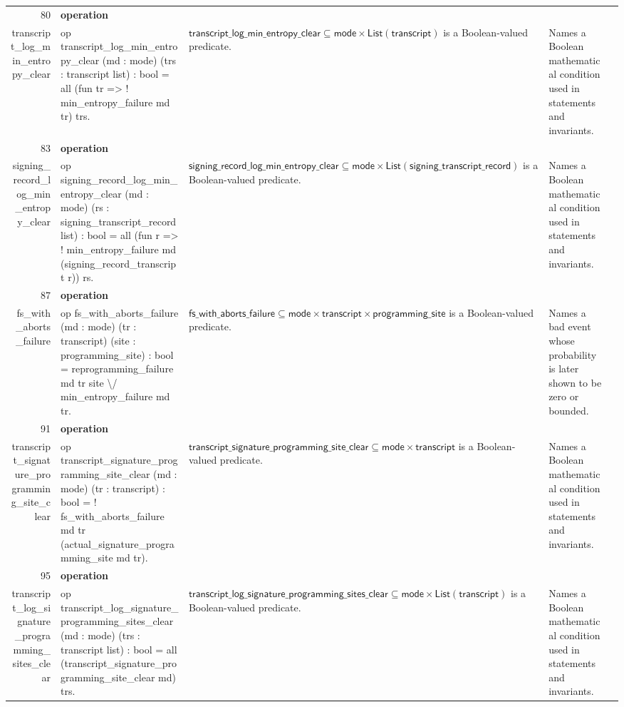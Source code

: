 \documentclass[10pt]{article}
\newcommand{\ec}[1]{\begingroup\ttfamily\scriptsize #1\endgroup}
\begin{document}
\begin{longtable}{r L{0.17\textwidth} L{0.26\textwidth} L{0.27\textwidth} L{0.20\textwidth}}
80 & \textbf{operation}\\\ec{transcript\_log\_min\_entropy\_clear} & \ec{op transcript\_log\_min\_entropy\_clear (md : mode) (trs : transcript list) : bool = all (fun tr => ! min\_entropy\_failure md tr) trs.} & \(\mathsf{transcript\_log\_min\_entropy\_clear} \subseteq \mathsf{mode} \times \mathsf{List}(\mathsf{transcript})\) is a Boolean-valued predicate. & Names a Boolean mathematical condition used in statements and invariants. \\
83 & \textbf{operation}\\\ec{signing\_record\_log\_min\_entropy\_clear} & \ec{op signing\_record\_log\_min\_entropy\_clear (md : mode) (rs : signing\_transcript\_record list) : bool = all (fun r => ! min\_entropy\_failure md (signing\_record\_transcript r)) rs.} & \(\mathsf{signing\_record\_log\_min\_entropy\_clear} \subseteq \mathsf{mode} \times \mathsf{List}(\mathsf{signing\_transcript\_record})\) is a Boolean-valued predicate. & Names a Boolean mathematical condition used in statements and invariants. \\
87 & \textbf{operation}\\\ec{fs\_with\_aborts\_failure} & \ec{op fs\_with\_aborts\_failure (md : mode) (tr : transcript) (site : programming\_site) : bool = reprogramming\_failure md tr site \textbackslash{}/ min\_entropy\_failure md tr.} & \(\mathsf{fs\_with\_aborts\_failure} \subseteq \mathsf{mode} \times \mathsf{transcript} \times \mathsf{programming\_site}\) is a Boolean-valued predicate. & Names a bad event whose probability is later shown to be zero or bounded. \\
91 & \textbf{operation}\\\ec{transcript\_signature\_programming\_site\_clear} & \ec{op transcript\_signature\_programming\_site\_clear (md : mode) (tr : transcript) : bool = ! fs\_with\_aborts\_failure md tr (actual\_signature\_programming\_site md tr).} & \(\mathsf{transcript\_signature\_programming\_site\_clear} \subseteq \mathsf{mode} \times \mathsf{transcript}\) is a Boolean-valued predicate. & Names a Boolean mathematical condition used in statements and invariants. \\
95 & \textbf{operation}\\\ec{transcript\_log\_signature\_programming\_sites\_clear} & \ec{op transcript\_log\_signature\_programming\_sites\_clear (md : mode) (trs : transcript list) : bool = all (transcript\_signature\_programming\_site\_clear md) trs.} & \(\mathsf{transcript\_log\_signature\_programming\_sites\_clear} \subseteq \mathsf{mode} \times \mathsf{List}(\mathsf{transcript})\) is a Boolean-valued predicate. & Names a Boolean mathematical condition used in statements and invariants. \\

\end{longtable}
\end{document}
